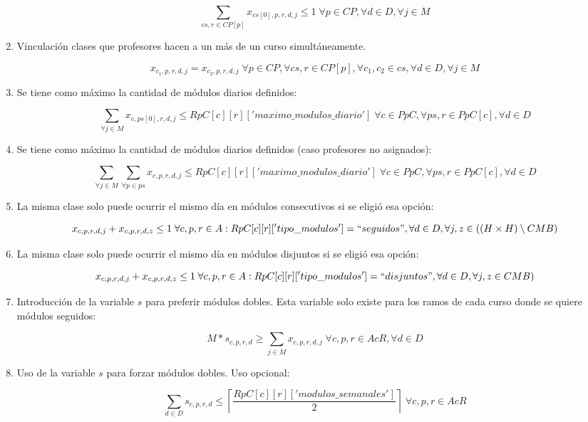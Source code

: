 \documentclass[letterpaper]{article}
\begin{document}
\begin{enumerate}
    $$\sum_{cs,r \in CP[p]} x_{cs[0],p,r,d,j} \leq 1 \; \forall p \in CP, \forall d \in D, \forall j \in M$$

    \item Vinculación clases que profesores hacen a un más de un curso simultáneamente.
    
    $$x_{c_1,p,r,d,j} = x_{c_2,p,r,d,j} \; \forall p \in CP, \forall cs,r \in CP[p], \forall c_1,c_2 \in cs, \forall d \in D, \forall j \in M$$

    \item Se tiene como máximo la cantidad de módulos diarios definidos:

    $$\sum_{\forall j \in M} x_{c,ps[0],r,d,j} \leq RpC[c][r]['maximo\_modulos\_diario'] \; \forall c \in PpC, \forall ps,r \in PpC[c], \forall d \in D$$

    \item Se tiene como máximo la cantidad de módulos diarios definidos (caso profesores no asignados):

    $$\sum_{\forall j \in M} \sum_{\forall p \in ps} x_{c,p,r,d,j} \leq RpC[c][r]['maximo\_modulos\_diario'] \; \forall c \in PpC, \forall ps,r \in PpC[c], \forall d \in D$$

    \item La misma clase solo puede ocurrir el mismo día en módulos consecutivos si se eligió esa opción:

    $$x_{c,p,r,d,j} + x_{c,p,r,d,z} \leq 1 \; \forall c,p,r \in A : RpC[c][r]['tipo\_modulos'] = ``seguidos", \forall d \in D, \forall j,z \in \left((H \times H) \setminus CMB \right)$$

    \item La misma clase solo puede ocurrir el mismo día en módulos disjuntos si se eligió esa opción:

    $$x_{c,p,r,d,j} + x_{c,p,r,d,z} \leq 1 \; \forall c,p,r \in A : RpC[c][r]['tipo\_modulos'] = ``disjuntos", \forall d \in D, \forall j,z \in CMB)$$

    \item Introducción de la variable $s$ para preferir módulos dobles. Esta variable solo existe para los ramos de cada curso donde se quiere módulos seguidos:

    $$M * s_{c,p,r,d} \geq \sum_{j \in M} x_{c,p,r,d,j} \; \forall c,p,r \in AcR, \forall d \in D$$

    \item Uso de la variable $s$ para forzar módulos dobles. Uso opcional:

    $$\sum_{d \in D} s_{c,p,r,d} \leq \left\lceil \frac{RpC[c][r]['modulos\_semanales']}{2} \right\rceil \; \forall c,p,r \in AcR$$


\end{enumerate}
\end{document}
